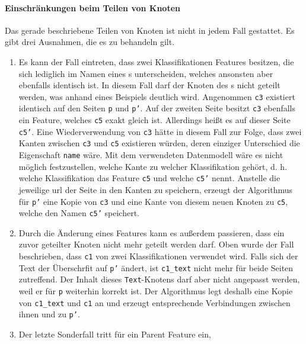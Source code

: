     \paragraph{Einschränkungen beim Teilen von Knoten}
    Das gerade beschriebene Teilen von Knoten ist nicht in jedem Fall gestattet.
    Es gibt drei Ausnahmen, die es zu behandeln gilt.

    \begin{enumerate}
        \item Es kann der Fall eintreten, dass zwei Klassifikationen Features besitzen,
        die sich lediglich im Namen eines {\childFeature}s unterscheiden,
        welches ansonsten aber ebenfalls identisch ist.
        In diesem Fall darf der Knoten des {\parentFeature}s nicht geteilt werden,
        was anhand eines Beispiels deutlich wird.
        Angenommen \texttt{c3} existiert identisch auf den Seiten \texttt{p} und \texttt{p'}.
        Auf der zweiten Seite besitzt \texttt{c3} ebenfalls ein Feature,
        welches \texttt{c5} exakt gleich ist.
        Allerdings heißt es auf dieser Seite \texttt{c5'}.
        Eine Wiederverwendung von \texttt{c3} hätte in diesem Fall zur Folge,
        dass zwei Kanten zwischen \texttt{c3} und \texttt{c5} existieren würden,
        deren einziger Unterschied die Eigenschaft \texttt{name} wäre.
        Mit dem verwendeten Datenmodell wäre es nicht möglich festzustellen,
        welche Kante zu welcher Klassifikation gehört,
        d. h. welche Klassifikation das Feature \texttt{c5} und welche \texttt{c5'} nennt.
        Anstelle die jeweilige \gls{url} der Seite in den Kanten zu speichern,
        erzeugt der Algorithmus für \texttt{p'} eine Kopie von \texttt{c3}
        und eine Kante von diesem neuen Knoten zu \texttt{c5},
        welche den Namen \texttt{c5'} speichert.
        \item Durch die Änderung eines Features kann es außerdem passieren,
        dass ein zuvor geteilter Knoten nicht mehr geteilt werden darf.
        Oben wurde der Fall beschrieben, dass \texttt{c1}
        von zwei Klassifikationen verwendet wird.
        Falls sich der Text der Überschrfit auf \texttt{p'} ändert,
        ist \texttt{c1\_text} nicht mehr für beide Seiten zutreffend.
        Der Inhalt dieses \texttt{Text}-Knotens darf aber nicht angepasst werden,
        weil er für \texttt{p} weiterhin korrekt ist.
        Der Algorithmus legt deshalb eine Kopie von \texttt{c1\_text} und \texttt{c1} an
        und erzeugt entsprechende Verbindungen zwischen ihnen und zu \texttt{p'}.
        \item Der letzte Sonderfall tritt für ein Parent Feature ein,

\end{enumerate}
